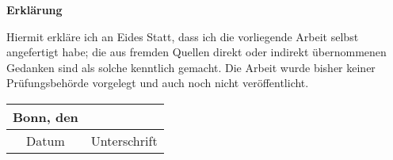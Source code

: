 \thispagestyle{empty}
\begin{center}
\huge \textbf{Erklärung}
\end{center}
\vspace{5cm}
Hiermit erkläre ich an Eides Statt, dass ich die vorliegende Arbeit selbst angefertigt habe; 
die aus fremden Quellen direkt oder indirekt übernommenen Gedanken sind als solche kenntlich 
gemacht. Die Arbeit wurde bisher keiner Prüfungsbehörde vorgelegt und auch noch nicht veröffentlicht.
\vspace*{8cm}
\begin{table}[h!]
 \centering
 \begin{tabular}{cc}
  Bonn, den \iftoggle{german}{\ThesisPubDate}{\germandate{\ThesisPubDate}} & \hspace*{6cm} \\
  \midrule
  Datum								& Unterschrift\\
 \end{tabular}
\end{table}